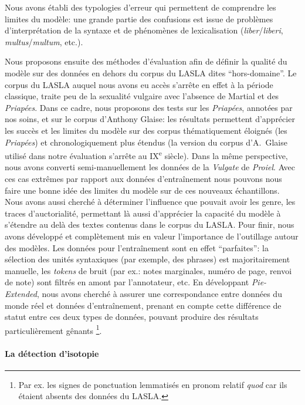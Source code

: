 Nous avons établi des typologies d'erreur qui permettent de comprendre les limites du modèle: une grande partie des confusions est issue de problèmes d'interprétation de la syntaxe et de phénomènes de lexicalisation (\textit{liber}/\textit{liberi}, \textit{multus}/\textit{multum}, etc.).

Nous proposons ensuite des méthodes d'évaluation afin de définir la qualité du modèle sur des données en dehors du corpus du LASLA dites \enquote{hors-domaine}. Le corpus du LASLA auquel nous avons eu accès s'arrête en effet à la période classique, traite peu de la sexualité vulgaire avec l'absence de Martial et des \textit{Priapées}. Dans ce cadre, nous proposons des tests sur les \textit{Priapées}, annotées par nos soins, et sur le corpus d'Anthony Glaise: les résultats permettent d'apprécier les succès et les limites du modèle sur des corpus thématiquement éloignés (les \textit{Priapées}) et chronologiquement plus étendus (la version du corpus d'A.~Glaise utilisé dans notre évaluation s'arrête au IX\textsuperscript{e} siècle). Dans la même perspective, nous avons converti semi-manuellement les données de la \textit{Vulgate} de \textit{Proiel}. Avec ces cas extrêmes par rapport aux données d'entraînement nous pouvons nous faire une bonne idée
des limites du modèle sur de ces nouveaux échantillons. Nous avons aussi cherché à déterminer l'influence que pouvait avoir les genre, les traces d'auctorialité, permettant là aussi d'apprécier la capacité du modèle à s'étendre au delà des textes contenus dans le corpus du LASLA. Pour finir, nous avons développé et complètement mis en valeur l'importance de l'outillage autour des modèles. Les données pour l'entraînement sont en effet \enquote{parfaites}: la sélection des unités syntaxiques (par exemple, des phrases) est majoritairement manuelle, les \textit{tokens} de bruit (par ex.: notes marginales, numéro de page, renvoi de note) sont filtrés en amont par l'annotateur, etc. En développant \textit{Pie-Extended}, nous avons cherché à assurer une correspondance entre données du monde réel et données d'entraînement, prenant en compte cette différence de statut entre ces deux types de données, pouvant produire des résultats particulièrement gênants \footnote{Par ex.
les signes de ponctuation lemmatisés en pronom relatif \textit{quod} car ils étaient absents des données du LASLA.}.


\paragraph{La détection d'isotopie}

